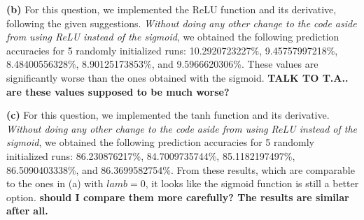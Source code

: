 \documentclass[leqno]{article}
\begin{document}
\hfill 

\noindent \textbf{(b)} For this question, we implemented the ReLU function and its derivative, following the given suggestions. \textit{Without doing any other change to 
the code aside from using ReLU instead of the sigmoid}, we obtained the following prediction accuracies for 5 randomly initialized runs: 
10.2920723227\%, 9.45757997218\%, 8.48400556328\%, 8.90125173853\%, and 9.5966620306\%. These values are significantly worse than the ones obtained with the 
sigmoid. \textbf{TALK TO T.A.. are these values supposed to be much worse?}

\hfill

\noindent \textbf{(c)} For this question, we implemented the tanh function and its derivative. \textit{Without doing any other change to 
the code aside from using ReLU instead of the sigmoid}, we obtained the following prediction accuracies for 5 randomly initialized runs:
86.230876217\%, 84.7009735744\%, 85.1182197497\%, 86.5090403338\%, and 86.3699582754\%. From these results, which are comparable to the 
ones in (a) with $lamb = 0$, it looks like the sigmoid function is still a better option. \textbf{should I compare them more carefully? 
The results are similar after all.} 
\end{document}
